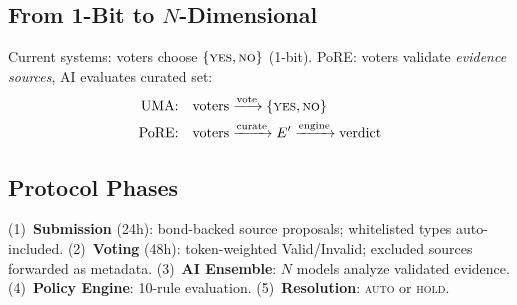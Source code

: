 \documentclass[11pt,a4paper,twocolumn]{article}
\begin{document}
\subsection{From 1-Bit to $N$-Dimensional}

Current systems: voters choose $\{\textsc{yes}, \textsc{no}\}$ (1-bit). PoRE: voters validate \emph{evidence sources}, AI evaluates curated set:
\begin{align*}
\text{UMA:}&\quad \text{voters} \xrightarrow{\text{vote}} \{\textsc{yes},\textsc{no}\} \\
\text{PoRE:}&\quad \text{voters} \xrightarrow{\text{curate}} E' \xrightarrow{\text{engine}} \text{verdict}
\end{align*}

\subsection{Protocol Phases}

(1)~\textbf{Submission} (24h): bond-backed source proposals; whitelisted types auto-included. (2)~\textbf{Voting} (48h): token-weighted Valid/Invalid; excluded sources forwarded as metadata. (3)~\textbf{AI Ensemble}: $N$ models analyze validated evidence. (4)~\textbf{Policy Engine}: 10-rule evaluation. (5)~\textbf{Resolution}: \textsc{auto} or \textsc{hold}.
\end{document}
